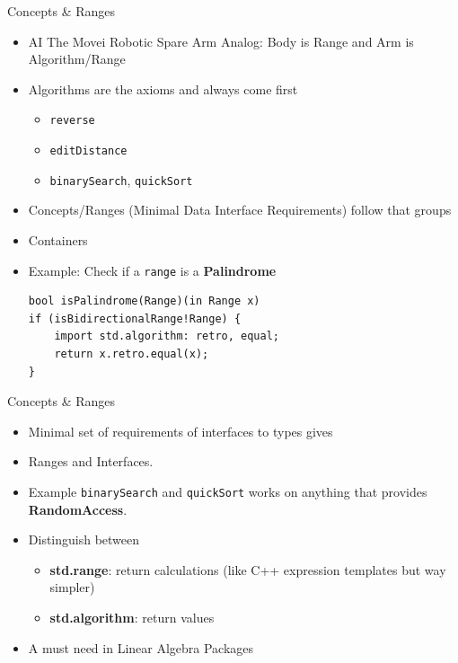 \documentclass[xcolor=dvipsnames]{beamer}
\begin{document}

\begin{frame}[fragile]{Concepts \& Ranges}
    \begin{itemize}[<+->]
    \item AI The Movei Robotic Spare Arm Analog: Body is Range and Arm is
      Algorithm/Range
    \item Algorithms are the axioms and always come first
      \begin{itemize}[<+->]
      \item \texttt{reverse}
      \item \texttt{editDistance}
      \item \texttt{binarySearch}, \texttt{quickSort}
      \end{itemize}
    \item Concepts/Ranges (Minimal Data Interface Requirements) follow that groups
    \item Containers
    \item Example: Check if a \texttt{range} is a \textbf{Palindrome}
    \begin{lstlisting}[frame=single]
bool isPalindrome(Range)(in Range x)
if (isBidirectionalRange!Range) {
    import std.algorithm: retro, equal;
    return x.retro.equal(x);
}
    \end{lstlisting}
    \end{itemize}
\end{frame}

\begin{frame}[fragile]{Concepts \& Ranges}
  \begin{itemize}[<+->]
  \item Minimal set of requirements of interfaces to types gives
  \item Ranges and Interfaces.
  \item Example \texttt{binarySearch} and \texttt{quickSort} works on anything
    that provides \textbf{RandomAccess}.
  \item Distinguish between
    \begin{itemize}[<+->]
    \item \textbf{std.range}: return calculations (like C++ expression templates
      but way simpler)
    \item \textbf{std.algorithm}: return values
    \end{itemize}
  \item A must need in Linear Algebra Packages
  \end{itemize}
\end{frame}
\end{document}
